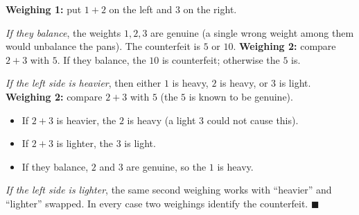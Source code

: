 \textbf{Weighing 1:} put $1+2$ on the left and $3$ on the right.

\emph{If they balance}, the weights $1,2,3$ are genuine (a single wrong weight among them would unbalance the pans). The counterfeit is $5$ or $10$. \textbf{Weighing 2:} compare $2+3$ with $5$. If they balance, the $10$ is counterfeit; otherwise the $5$ is.

\emph{If the left side is heavier}, then either $1$ is heavy, $2$ is heavy, or $3$ is light. \textbf{Weighing 2:} compare $2+3$ with $5$ (the $5$ is known to be genuine).
\begin{itemize}
\item If $2+3$ is heavier, the $2$ is heavy (a light $3$ could not cause this).
\item If $2+3$ is lighter, the $3$ is light.
\item If they balance, $2$ and $3$ are genuine, so the $1$ is heavy.
\end{itemize}
\emph{If the left side is lighter}, the same second weighing works with ``heavier'' and ``lighter'' swapped. In every case two weighings identify the counterfeit. $\blacksquare$
